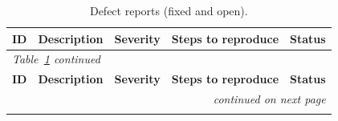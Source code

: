 \documentclass[11pt]{article}
\begin{document}
{\footnotesize
\begin{longtable}{p{0.8cm} p{4.0cm} p{1.5cm} p{4.6cm} p{2.6cm}}
\caption{Defect reports (fixed and open).}\label{tab:defects}\\
\toprule
\textbf{ID} & \textbf{Description} & \textbf{Severity} & \textbf{Steps to
reproduce} & \textbf{Status} \\
\midrule
\endfirsthead
\multicolumn{5}{l}{\footnotesize\itshape Table~\ref{tab:defects} continued}\\
\toprule
\textbf{ID} & \textbf{Description} & \textbf{Severity} & \textbf{Steps to
reproduce} & \textbf{Status} \\
\midrule
\endhead
\midrule \multicolumn{5}{r}{\footnotesize\itshape continued on next page}\\
\endfoot
\bottomrule
\endlastfoot


\end{longtable}}
\end{document}
